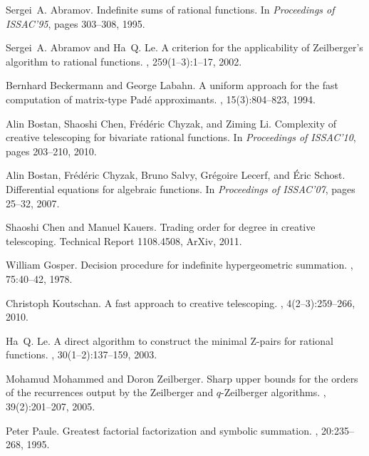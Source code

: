\documentclass{sig-alternate}
\begin{document}
\begin{thebibliography}{10}

Sergei~A. Abramov.
\newblock Indefinite sums of rational functions.
\newblock In {\em Proceedings of ISSAC'95}, pages 303--308, 1995.

Sergei~A. Abramov and Ha~Q. Le.
\newblock A criterion for the applicability of {Z}eilberger's algorithm to
  rational functions.
, 259(1--3):1--17, 2002.

Bernhard Beckermann and George Labahn.
\newblock A uniform approach for the fast computation of matrix-type {P}ad{\'e}
  approximants.
,
  15(3):804--823, 1994.

Alin Bostan, Shaoshi Chen, Fr\'{e}d\'{e}ric Chyzak, and Ziming Li.
\newblock Complexity of creative telescoping for bivariate rational functions.
\newblock In {\em Proceedings of ISSAC'10}, pages 203--210, 2010.

Alin Bostan, Fr{\'e}d{\'e}ric Chyzak, Bruno Salvy, Gr{\'e}goire Lecerf, and
  {\'E}ric Schost.
\newblock Differential equations for algebraic functions.
\newblock In {\em Proceedings of ISSAC'07}, pages 25--32, 2007.

Shaoshi Chen and Manuel Kauers.
\newblock Trading order for degree in creative telescoping.
\newblock Technical Report 1108.4508, ArXiv, 2011.

William Gosper.
\newblock Decision procedure for indefinite hypergeometric summation.
, 75:40--42, 1978.

Christoph Koutschan.
\newblock A fast approach to creative telescoping.
, 4(2--3):259--266, 2010.

Ha~Q. Le.
\newblock A direct algorithm to construct the minimal {Z}-pairs for rational
  functions.
, 30(1--2):137--159, 2003.

Mohamud Mohammed and Doron Zeilberger.
\newblock Sharp upper bounds for the orders of the recurrences output by the
  {Z}eilberger and $q$-{Z}eilberger algorithms.
, 39(2):201--207, 2005.

Peter Paule.
\newblock Greatest factorial factorization and symbolic summation.
, 20:235--268, 1995.


\end{thebibliography}
\end{document}
